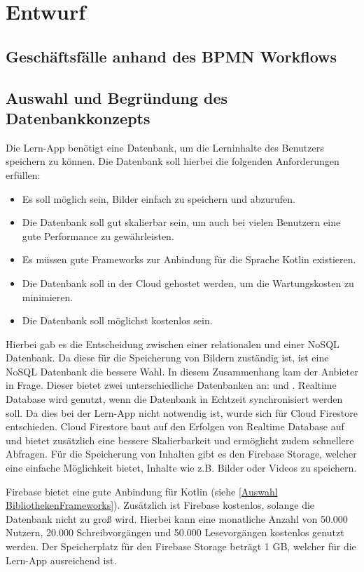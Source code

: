 \section{Entwurf}
\subsection{Geschäftsfälle anhand des BPMN Workflows}
\subsection{Auswahl und Begründung des Datenbankkonzepts}
Die Lern-App  benötigt eine Datenbank, um die Lerninhalte des Benutzers speichern zu können. Die Datenbank soll hierbei die folgenden Anforderungen erfüllen:
\begin{itemize}
    \item Es soll möglich sein, Bilder einfach zu speichern und abzurufen.
    \item Die Datenbank soll gut skalierbar sein, um auch bei vielen Benutzern eine gute Performance zu gewährleisten.
    \item Es müssen gute Frameworks zur Anbindung für die Sprache Kotlin existieren.
    \item Die Datenbank soll in der Cloud gehostet werden, um die Wartungskosten zu minimieren.
    \item Die Datenbank soll möglichst kostenlos sein.
\end{itemize}

\noindent
Hierbei gab es die Entscheidung zwischen einer relationalen und einer NoSQL Datenbank. Da diese für die Speicherung von Bildern zuständig ist, ist eine NoSQL Datenbank die bessere Wahl. In diesem Zusammenhang kam der Anbieter  in Frage. Dieser bietet zwei unterschiedliche Datenbanken an:  und . Realtime Database wird genutzt, wenn die Datenbank in Echtzeit synchronisiert werden soll. Da dies bei der Lern-App nicht notwendig ist, wurde sich für Cloud Firestore entschieden. Cloud Firestore baut auf den Erfolgen von Realtime Database auf und bietet zusätzlich eine bessere Skalierbarkeit und ermöglicht zudem schnellere Abfragen. \cite*{Firestore} Für die Speicherung von Inhalten gibt es den Firebase Storage, welcher eine einfache Möglichkeit bietet, Inhalte wie z.B. Bilder oder Videos zu speichern. \newline

\noindent
Firebase bietet eine gute Anbindung für Kotlin (siehe \ref*{Auswahl BibliothekenFrameworks}). Zusätzlich ist Firebase kostenlos, solange die Datenbank nicht zu groß wird. Hierbei kann eine monatliche Anzahl von 50.000 Nutzern, 20.000 Schreibvorgängen und 50.000 Lesevorgängen kostenlos genutzt werden. Der Speicherplatz für den Firebase Storage beträgt 1 GB, welcher für die Lern-App ausreichend ist. \cite*{Firebase_Pricing}
